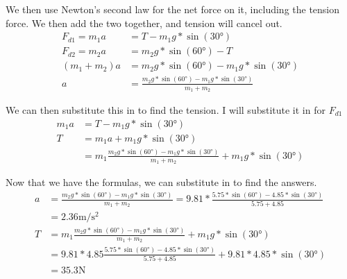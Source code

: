 \documentclass[12pt]{article}
\begin{document}
We then use Newton's second law for the net force on it, including the tension force. We then add the two together, and tension will cancel out.
\begin{align*}
    F_{d1} = m_1 a &= T - m_1 g * \sin(30\unit{\degree})\\
    F_{d2} = m_2 a &= m_2 g * \sin(60\unit{\degree}) - T\\
    (m_1 + m_2)a &= m_2 g * \sin(60\unit{\degree}) - m_1 g * \sin(30\unit{\degree})\\
    a &= \frac{m_2 g * \sin(60\unit{\degree}) - m_1 g * \sin(30\unit{\degree})}{m_1 + m_2}
\end{align*}

We can then substitute this in to find the tension. I will substitute it in for $F_{d1}$
\begin{align*}
    m_1 a &= T - m_1 g * \sin(30\unit{\degree})\\
    T &= m_1 a + m_1 g * \sin(30\unit{\degree})\\
        &= m_1 \frac{m_2 g * \sin(60\unit{\degree}) - m_1 g * \sin(30\unit{\degree})}{m_1 + m_2} + m_1 g * \sin(30\unit{\degree})
\end{align*}

\pagebreak
Now that we have the formulas, we can substitute in to find the answers.
\begin{align*}
    a &= \frac{m_2 g * \sin(60\unit{\degree}) - m_1 g * \sin(30\unit{\degree})}{m_1 + m_2} 
        = 9.81 * \frac{5.75 * \sin(60\unit{\degree}) - 4.85 * \sin(30\unit{\degree})}{5.75 + 4.85}\\
        &= \boxed{2.36 \unit{\meter/\second^2}}\\
    T &= m_1 \frac{m_2 g * \sin(60\unit{\degree}) - m_1 g * \sin(30\unit{\degree})}{m_1 + m_2} + m_1 g * \sin(30\unit{\degree})\\
        &= 9.81 * 4.85 \frac{5.75 * \sin(60\unit{\degree}) - 4.85 * \sin(30\unit{\degree})}{5.75 + 4.85} + 9.81 * 4.85 * \sin(30\unit{\degree})\\
        &= \boxed{35.3 \unit{\newton}}
\end{align*}
\end{document}
